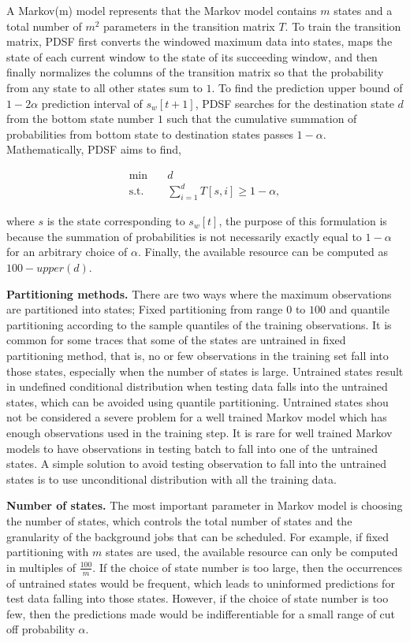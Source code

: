 \documentclass[sigplan,10pt,review,anonymous]{acmart}
\begin{document}
A Markov(m) model represents that the Markov model contains $m$ states and a
total number of $m^2$ parameters in the transition matrix $T$. To train the
transition matrix, PDSF first converts the windowed maximum data into
states, maps the state of each current window to the state of its succeeding
window, and then finally normalizes the columns of the transition matrix so that
the probability from any state to all other states sum to $1$. To find the
prediction upper bound of $1 - 2\alpha$ prediction interval of $s_w[t + 1]$,
PDSF searches for the destination state $d$ from the bottom state number
$1$ such that the cumulative summation of probabilities from bottom state to
destination states passes $1 - \alpha$. Mathematically, PDSF aims to
find,

\begin{equation}
  \begin{aligned}
  \min \quad & d\\
  \textrm{s.t.} \quad & \sum_{i = 1}^{d} T[s, i] \geq 1 - \alpha,
  \end{aligned}
\end{equation}

where $s$ is the state corresponding to $s_w[t]$, the purpose of this
formulation is because the summation of probabilities is not necessarily exactly
equal to $1 - \alpha$ for an arbitrary choice of $\alpha$. Finally, the available
resource can be computed as $100 - upper(d)$. 

\textbf{Partitioning methods.} There are two ways where the maximum observations
are partitioned into states; Fixed partitioning from range $0$ to $100$ and
quantile partitioning according to the sample quantiles of the training
observations. It is common for some traces that some of the states are untrained
in fixed partitioning method, that is, no or few observations in the training
set fall into those states, especially when the number of states is large.
Untrained states result in undefined conditional distribution when testing data
falls into the untrained states, which can be avoided using quantile
partitioning. Untrained states shou not be considered a severe problem for a
well trained Markov model which has enough observations used in the training
step. It is rare for well trained Markov models to have observations
in testing batch to fall into one of the untrained states. A simple solution to
avoid testing observation to fall into the untrained states is to use
unconditional distribution with all the training data.

\textbf{Number of states.} The most important parameter in Markov model is
choosing the number of states, which controls the total number of states and the
granularity of the background jobs that can be scheduled. For example, if fixed
partitioning with $m$ states are used, the available resource can only be
computed in multiples of $\frac{100}{m}$. If the choice of state number is too
large, then the occurrences of untrained states would be frequent, which leads
to uninformed predictions for test data falling into those states. However, if
the choice of state number is too few, then the predictions made would be
indifferentiable for a small range of cut off probability $\alpha$.
\end{document}

